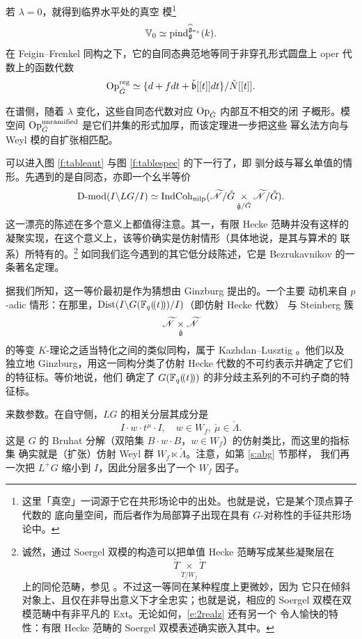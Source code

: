 \begin{ex}\label{e:regop} 若 $\lambda = 0$，就得到临界水平处的真空
模\footnote{这里「真空」一词源于它在共形场论中的出处。也就是说，它是某个顶点算子代数的
底向量空间，而后者作为局部算子出现在具有 $G$-对称性的手征共形场论中。}
	\[
	  \mathbb{V}_0 \simeq \operatorname{pind}_{\mathfrak{g}}^{\widehat{\mathfrak{g}}_{\kappa_c}}(k).
	\]
在 Feigin--Frenkel 同构之下，它的自同态典范地等同于非穿孔形式圆盘上
oper 代数上的函数代数
%
\[
    \mathrm{Op}_{\check{G}}^{\operatorname{reg}} \simeq \{ d + f dt + \check{\mathfrak{b}}[[t]]dt \} / \check{N}[[t]].
\]
%
\end{ex}

在谱侧，随着 $\lambda$ 变化，这些自同态代数对应 $\mathrm{Op}_{\check{G}}$ 内部互不相交的闭
子概形。模空间 $\mathrm{Op}_{\check{G}}^{\operatorname{unramified}}$ 是它们并集的形式加厚，而该定理进一步把这些
幂幺法方向与 Weyl 模的自扩张相匹配。

\ssszh\label{s:2realz} 可以进入图 \ref{f:tableaut} 与图 \ref{f:tablespec} 的下一行了，即
驯分歧与幂幺单值的情形。先遇到的是自同态，亦即一个幺半等价
%
\begin{equation} \label{e:2realz}
 \operatorname{D-mod}(I \backslash LG / I) \simeq \operatorname{IndCoh}_{\operatorname{nilp}}( \widetilde{\mathscr{N}} / \check{G} \underset {\check{\mathfrak{g}}
 / \check{G}} \times \widetilde{\mathscr{N}} / \check{G}).
\end{equation}
%
这一漂亮的陈述在多个意义上都值得注意。其一，有限 Hecke 范畴并没有这样的
凝聚实现，在这个意义上，该等价确实是仿射情形（具体地说，是其与算术的
联系）所特有的。\footnote{诚然，通过 Soergel 双模的构造可以把单值 Hecke
范畴写成某些凝聚层在
\[
\check{T} \underset {\check{T}/W_f}{\times} \check{T}
\]
上的同伦范畴，参见 \cite{bezrichetop}。不过这一等同在某种程度上更微妙，因为
它只在倾斜对象上、且仅在非导出意义下才全忠实；也就是说，相应的
Soergel 双模在双模范畴中有非平凡的 Ext。无论如何，\eqref{e:2realz} 还有另一个
令人愉快的特性：有限 Hecke 范畴的 Soergel 双模表述确实嵌入其中。}
如同我们迄今遇到的其它低分歧陈述，它是 Bezrukavnikov \cite{bez2realz} 的一条著名定理。

据我们所知，这一等价最初是作为猜想由 Ginzburg \cite{chrissginzburg} 提出的。一个主要
动机来自 $p$-adic 情形：在那里，$\operatorname{Dist}(I \backslash G(\mathbb{F}_q(\!(t)\!)) / I)$（即仿射 Hecke 代数）
与 Steinberg 簇
\[
\widetilde{\mathscr{N}} \underset {\check{\mathfrak{g}}} \times \widetilde{\mathscr{N}}
\]
的等变 $K$-理论之适当特化之间的类似同构，属于 Kazhdan--Lusztig \cite{kazhdanlusztig87}。他们以及
独立地 Ginzburg，用这一同构分类了仿射 Hecke 代数的不可约表示并确定了它们的特征标。等价地说，他们
确定了 $G(\mathbb{F}_q(\!(t)\!))$ 的非分歧主系列的不可约子商的特征标。

来数参数。在自守侧，$LG$ 的相关分层其成分是
%
\[
    I\cdot w \cdot t^{\check{\mu}} \cdot I, \quad w \in W_f,\ \check{\mu} \in \check{\Lambda}.
\]
%
这是 $G$ 的 Bruhat 分解（双陪集 $B \cdot w \cdot B$，$w \in W_f$）的仿射类比，而这里的指标集
确实就是（扩张）仿射 Weyl 群 $W_f \ltimes \check{\Lambda}$。注意，如第 \ref{s:abg} 节那样，
我们再一次把 $L^+G$ 缩小到 $I$，因此分层多出了一个 $W_f$ 因子。

